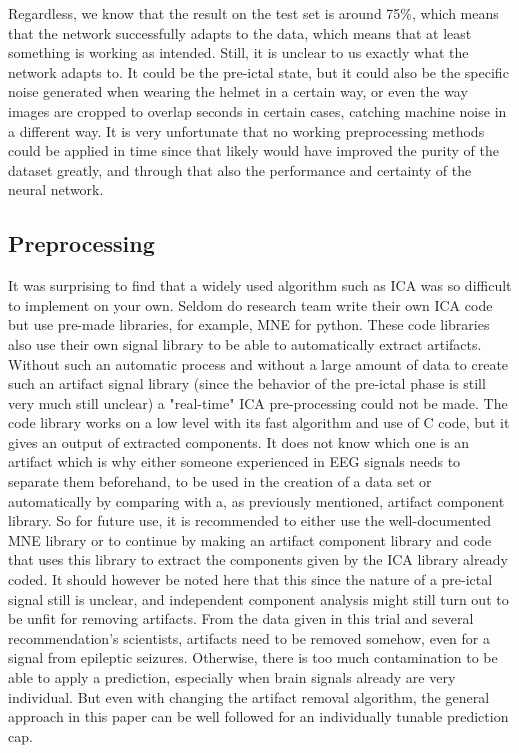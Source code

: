 Regardless, we know that the result on the test set is around 75\%, which means that the network successfully adapts to the data, which means that at least something is working as intended. Still, it is unclear to us exactly what the network adapts to. It could be the pre-ictal state, but it could also be the specific noise generated when wearing the helmet in a certain way, or even the way images are cropped to overlap seconds in certain cases, catching machine noise in a different way. It is very unfortunate that no working preprocessing methods could be applied in time since that likely would have improved the purity of the dataset greatly, and through that also the performance and certainty of the neural network. \\









\subsection{Preprocessing}
It was surprising to find that a widely used algorithm such as ICA was so difficult to implement on your own. Seldom do research team write their own ICA code but use pre-made libraries, for example, MNE for python. These code libraries also use their own signal library to be able to automatically extract artifacts. Without such an automatic process and without a large amount of data to create such an artifact signal library (since the behavior of the pre-ictal phase is still very much still unclear) a "real-time" ICA pre-processing could not be made. The code library works on a low level with its fast algorithm and use of C code, but it gives an output of extracted components. It does not know which one is an artifact which is why either someone experienced in EEG signals needs to separate them beforehand, to be used in the creation of a data set or automatically by comparing with a, as previously mentioned, artifact component library. So for future use, it is recommended to either use the well-documented MNE library or to continue by making an artifact component library and code that uses this library to extract the components given by the ICA library already coded. It should however be noted here that this since the nature of a pre-ictal signal still is unclear, and independent component analysis might still turn out to be unfit for removing artifacts. From the data given in this trial and several recommendation's scientists, artifacts need to be removed somehow, even for a signal from epileptic seizures. Otherwise, there is too much contamination to be able to apply a prediction, especially when brain signals already are very individual. But even with changing the artifact removal algorithm, the general approach in this paper can be well followed for an individually tunable prediction cap.

